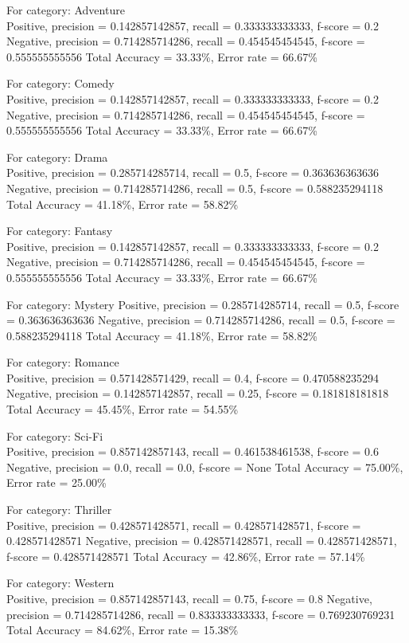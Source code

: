 \documentclass{article}
\begin{document}
For category: Adventure ~\\
Positive, precision = 0.142857142857, recall = 0.333333333333, f-score = 0.2 
Negative, precision = 0.714285714286, recall = 0.454545454545, f-score = 0.555555555556 
Total Accuracy = 33.33\%, Error rate = 66.67\%

For category: Comedy ~\\
Positive, precision = 0.142857142857, recall = 0.333333333333, f-score = 0.2 
Negative, precision = 0.714285714286, recall = 0.454545454545, f-score = 0.555555555556 
Total Accuracy = 33.33\%, Error rate = 66.67\%

For category: Drama ~\\
Positive, precision = 0.285714285714, recall = 0.5, f-score = 0.363636363636 
Negative, precision = 0.714285714286, recall = 0.5, f-score = 0.588235294118 
Total Accuracy = 41.18\%, Error rate = 58.82\%

For category: Fantasy ~\\
Positive, precision = 0.142857142857, recall = 0.333333333333, f-score = 0.2 
Negative, precision = 0.714285714286, recall = 0.454545454545, f-score = 0.555555555556 
Total Accuracy = 33.33\%, Error rate = 66.67\%

For category: Mystery
Positive, precision = 0.285714285714, recall = 0.5, f-score = 0.363636363636 
Negative, precision = 0.714285714286, recall = 0.5, f-score = 0.588235294118 
Total Accuracy = 41.18\%, Error rate = 58.82\%

For category: Romance ~\\
Positive, precision = 0.571428571429, recall = 0.4, f-score = 0.470588235294 
Negative, precision = 0.142857142857, recall = 0.25, f-score = 0.181818181818 
Total Accuracy = 45.45\%, Error rate = 54.55\%

For category: Sci-Fi ~\\
Positive, precision = 0.857142857143, recall = 0.461538461538, f-score = 0.6 
Negative, precision = 0.0, recall = 0.0, f-score = None 
Total Accuracy = 75.00\%, Error rate = 25.00\%

For category: Thriller ~\\
Positive, precision = 0.428571428571, recall = 0.428571428571, f-score = 0.428571428571 
Negative, precision = 0.428571428571, recall = 0.428571428571, f-score = 0.428571428571 
Total Accuracy = 42.86\%, Error rate = 57.14\%

For category: Western ~\\
Positive, precision = 0.857142857143, recall = 0.75, f-score = 0.8 
Negative, precision = 0.714285714286, recall = 0.833333333333, f-score = 0.769230769231 
Total Accuracy = 84.62\%, Error rate = 15.38\%
\end{document}
